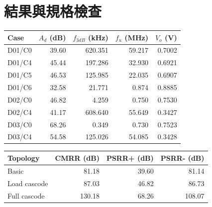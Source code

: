 \section{結果與規格檢查}
\begin{center}\small\begin{tabular}{lrrrr}\toprule
Case & $A_d$ (dB) & $f_{3dB}$ (kHz) & $f_u$ (MHz) & $V_o$ (V) \\ \midrule
D01/C0 & 39.60 & 620.351 & 59.217 & 0.7002 \\
D01/C4 & 45.44 & 197.286 & 32.930 & 0.6921 \\
D01/C5 & 46.53 & 125.985 & 22.035 & 0.6907 \\
D01/C6 & 32.58 & 21.771 & 0.874 & 0.8885 \\
D02/C0 & 46.82 & 4.259 & 0.750 & 0.7530 \\
D02/C4 & 41.17 & 608.640 & 55.649 & 0.3427 \\
D03/C0 & 68.26 & 0.349 & 0.730 & 0.7523 \\
D03/C4 & 54.58 & 125.026 & 54.085 & 0.3428 \\
\bottomrule\end{tabular}\end{center}
\begin{center}\small\begin{tabular}{lrrr}\toprule
Topology & CMRR (dB) & PSRR+ (dB) & PSRR- (dB) \\ \midrule
Basic & 81.18 & 39.60 & 81.14 \\
Load cascode & 87.03 & 46.82 & 86.73 \\
Full cascode & 130.18 & 68.26 & 108.07 \\
\bottomrule\end{tabular}\end{center}


